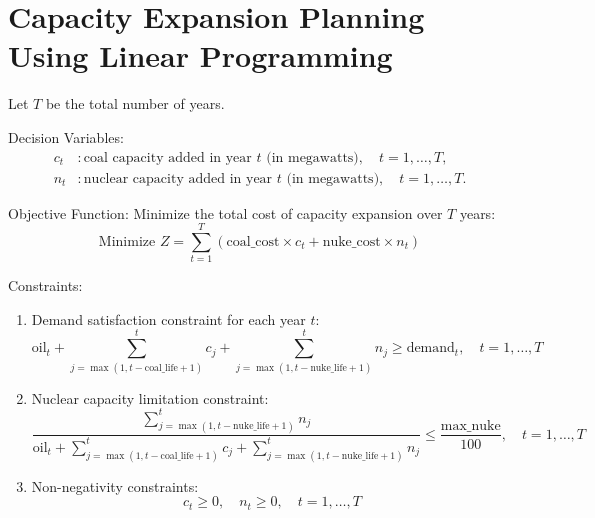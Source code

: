 \documentclass{article}
\begin{document}
\section*{Capacity Expansion Planning Using Linear Programming}

Let \( T \) be the total number of years.

Decision Variables:
\begin{align*}
c_t & : \text{coal capacity added in year } t \text{ (in megawatts)}, \quad t = 1, \ldots, T, \\
n_t & : \text{nuclear capacity added in year } t \text{ (in megawatts)}, \quad t = 1, \ldots, T.
\end{align*}

Objective Function:
Minimize the total cost of capacity expansion over \( T \) years:
\[
\text{Minimize } Z = \sum_{t=1}^{T} \left( \text{coal\_cost} \times c_t + \text{nuke\_cost} \times n_t \right)
\]

Constraints:
\begin{enumerate}
    \item Demand satisfaction constraint for each year \( t \):
    \[
    \text{oil}_t + \sum_{j=\max(1, t-\text{coal\_life}+1)}^{t} c_j + \sum_{j=\max(1, t-\text{nuke\_life}+1)}^{t} n_j \geq \text{demand}_t, \quad t = 1, \ldots, T
    \]

    \item Nuclear capacity limitation constraint:
    \[
    \frac{\sum_{j=\max(1, t-\text{nuke\_life}+1)}^{t} n_j}{\text{oil}_t + \sum_{j=\max(1, t-\text{coal\_life}+1)}^{t} c_j + \sum_{j=\max(1, t-\text{nuke\_life}+1)}^{t} n_j} \leq \frac{\text{max\_nuke}}{100}, \quad t = 1, \ldots, T
    \]

    \item Non-negativity constraints:
    \[
    c_t \geq 0, \quad n_t \geq 0, \quad t = 1, \ldots, T
    \]
\end{enumerate}
\end{document}
